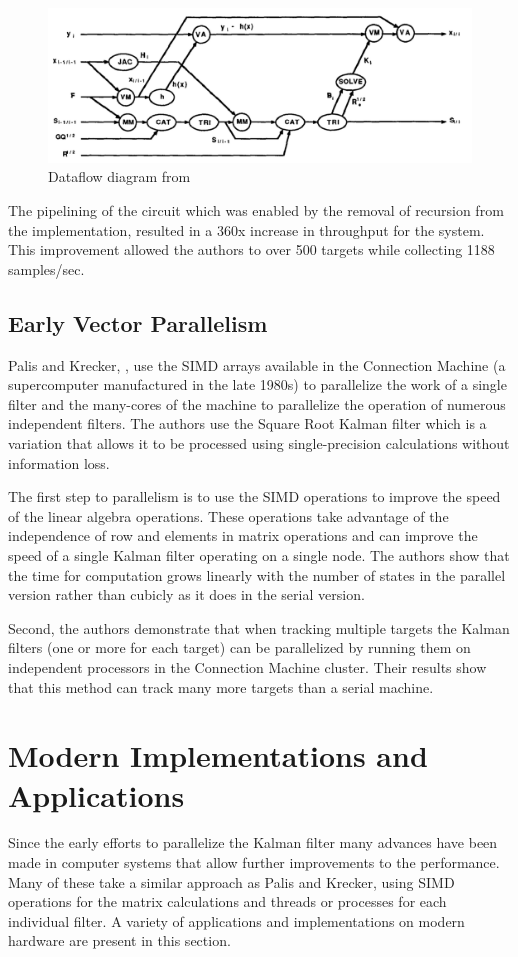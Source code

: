\documentclass[11pt]{article}
\begin{document}
\begin{figure}
\includegraphics[width=\textwidth]{shaffer.png}
\caption{Dataflow diagram from \cite{Shaffer:1987:IPE:42040.42101}}
\label{fig:shaffer}
\end{figure}

The pipelining of the circuit which was enabled by the removal of recursion from the implementation, resulted in a 360x increase in throughput for the system. This improvement allowed the authors to over 500 targets while collecting 1188 samples/sec.

\subsection{Early Vector Parallelism}
Palis and Krecker, \cite{palis1990parallel}, use the SIMD arrays available in the Connection Machine (a supercomputer manufactured in the late 1980s) to parallelize the work of a single filter and the many-cores of the machine to parallelize the operation of numerous independent filters. The authors use the Square Root Kalman filter which is a variation that allows it to be processed using single-precision calculations without information loss.

The first step to parallelism is to use the SIMD operations to improve the speed of the linear algebra operations. These operations take advantage of the independence of row and elements in matrix operations and can improve the speed of a single Kalman filter operating on a single node. The authors show that the time for computation grows linearly with the number of states in the parallel version rather than cubicly as it does in the serial version. 

Second, the authors demonstrate that when tracking multiple targets the Kalman filters (one or more for each target) can be parallelized by running them on independent processors in the Connection Machine cluster. Their results show that this method can track many more targets than a serial machine.

\section{Modern Implementations and Applications}
Since the early efforts to parallelize the Kalman filter many advances have been made in computer systems that allow further improvements to the performance. Many of these take a similar approach as Palis and Krecker, using SIMD operations for the matrix calculations and threads or processes for each individual filter. A variety of applications and implementations on modern hardware are present in this section.
\end{document}
